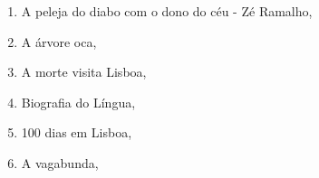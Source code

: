 \begin{multicols}{2}
\begin{enumerate}
\item A peleja do diabo com o dono do céu - Zé Ramalho, {}
\item A árvore oca, {}
\item A morte visita Lisboa, {}
\item Biografia do Língua, {}
\item 100 dias em Lisboa, {}
\item A vagabunda, {}
\end{enumerate}
\end{multicols}

\pagebreak

%
%
%
%
%
%
